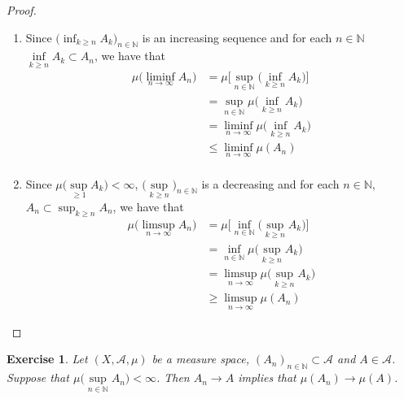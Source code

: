 \documentclass[12pt]{amsart}
\newtheorem{ex}[thm]{Exercise}
\newcommand{\N}{\mathbb{N}}
\newcommand{\MA}{\mathcal{A}}
\begin{document}
\begin{proof}\
\begin{enumerate}
\item Since $\bigg(\inf_{k \geq n}A_k \bigg)_{n \in \N}$ is an increasing sequence and for each $n \in \N$ $\inf\limits_{k \geq n}A_k \subset A_n$, we have that
\begin{align*}
\mu\bigg(\liminf\limits_{n \rightarrow \infty} A_n \bigg) 
& = \mu \bigg[\sup_{n \in \N} \bigg(\inf\limits_{k \geq n} A_k \bigg) \bigg] \\
&= \sup_{n \in \N}  \mu\bigg( \inf_{k \geq n}A_k\bigg)\\
& = \liminf_{n \rightarrow \infty} \mu\bigg( \inf_{k \geq n}A_k\bigg) \\
& \leq \liminf_{n \rightarrow \infty}  \mu(A_n) \\
\end{align*}
\item Since $\mu\bigg(\sup\limits_{ \geq 1}A_k \bigg) < \infty$, $\bigg(\sup\limits_{k \geq n} \bigg)_{n \in \N}$ is a decreasing and for each $n \in \N$, $A_n \subset \sup_{k \geq n}A_n$, we have that 
\begin{align*}
\mu \bigg(\limsup_{n \rightarrow \infty} A_n 
\bigg) 
&= \mu \bigg[\inf_{n \in \N} \bigg(\sup_{k  \geq n} A_k \bigg) \bigg] \\
&= \inf_{n \in \N}\mu\bigg( \sup_{k \geq n} A_k\bigg) \\
& = \limsup_{n \rightarrow \infty} \mu \bigg( \sup_{k \geq n}A_k \bigg) \\
& \geq \limsup_{n \rightarrow \infty} \mu ( A_n )\
\end{align*} 
\end{enumerate}
\end{proof}

\begin{ex}
Let $(X, \MA, \mu)$ be a measure space, $(A_n)_{n \in \N} \subset \MA$ and $A \in \MA$. Suppose that $\mu\bigg(\sup\limits_{n \in \N}A_n\bigg) < \infty$. Then $A_n \rightarrow A$ implies that $\mu(A_n) \rightarrow \mu(A)$. 
\end{ex} 
\end{document}
